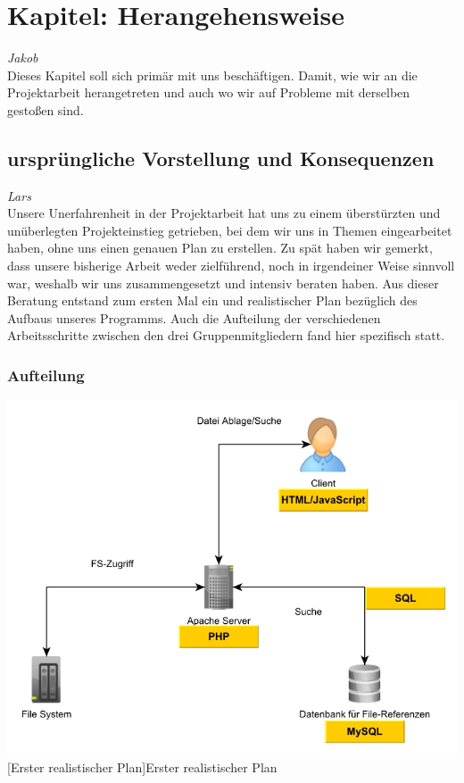 \documentclass[12pt,a4paper,bibliography=totocnumbered,listof=totocnumbered]{scrartcl}
\begin{document}
\onehalfspacing
\renewcommand{\thesection}{\arabic{section}}
\renewcommand{\theHsection}{\arabic{section}}
\setcounter{section}{0}
\setcounter{page}{1}

\section{Kapitel: Herangehensweise}
\emph{Jakob}\\
Dieses Kapitel soll sich primär mit uns beschäftigen.
Damit, wie wir an die Projektarbeit herangetreten und auch wo wir auf Probleme mit derselben gestoßen sind.

\subsection{ursprüngliche Vorstellung und Konsequenzen}
\emph{Lars}\\
Unsere Unerfahrenheit in der Projektarbeit hat uns zu einem überstürzten und unüberlegten Projekteinstieg getrieben, bei dem wir uns in Themen eingearbeitet haben, ohne uns einen genauen Plan zu erstellen. Zu spät haben wir gemerkt, dass unsere bisherige Arbeit weder zielführend, noch in irgendeiner Weise sinnvoll war, weshalb wir uns zusammengesetzt und intensiv beraten haben. Aus dieser Beratung entstand zum ersten Mal ein und realistischer Plan bezüglich des Aufbaus unseres Programms. Auch die Aufteilung der verschiedenen Arbeitsschritte zwischen den  drei Gruppenmitgliedern fand hier spezifisch statt.

\subsubsection{Aufteilung}
\label{sec:Aufteilung}

\vspace{1em}
\begin{minipage}{\linewidth}
	\centering
	\includegraphics[width=0.7\linewidth]{Bilder/Projekt-Entwurf.jpg}
	[Erster realistischer Plan]{Erster realistischer Plan}
	\label{fig:plan1}
\end{minipage}
\vspace{1em}
\end{document}

